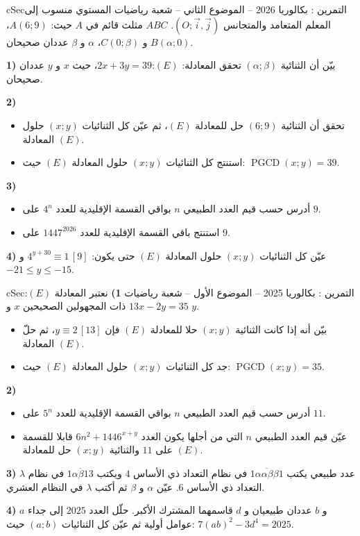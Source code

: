 \documentclass[12pt,a4paper]{article}
\newenvironment{BOX}[2]{\begin{otherlanguage}{english}\begin{arbox}{#1}{#2}}{\end{arbox}\end{otherlanguage}}
\newcounter{exo}
\newenvironment{tamrin}[1]{\stepcounter{exo}\begin{BOX}{cSec}{التمرين \theexo: #1}}{\end{BOX}}
\newcommand{\pgcd}{\operatorname{PGCD}}
\newenvironment{sq}{\begin{itemize}[leftmargin=2.4em,itemsep=3pt]}{\end{itemize}}
\newcommand{\qa}{\item[(أ)]}\newcommand{\qb}{\item[(ب)]}\newcommand{\qc}{\item[(جـ)]}\newcommand{\qd}{\item[(د)]}\newcommand{\qe}{\item[(هـ)]}
\begin{document}
\begin{tamrin}{بكالوريا 2026 -- الموضوع الثاني -- شعبة رياضيات}
المستوي منسوب إلى المعلم المتعامد والمتجانس $(O;\vec i,\vec j)$.
$ABC$ مثلث قائم في $A$ حيث: $A(6;9)$، $B(\alpha;0)$ و $C(0;\beta)$، $\alpha$ و $\beta$ عددان صحيحان.

\textbf{1)} بيّن أن الثنائية $(\alpha;\beta)$ تحقق المعادلة: $(E)$:\quad $2x+3y=39$، حيث $x$ و $y$ عددان صحيحان.

\textbf{2)}
\begin{sq}
\qa تحقق أن الثنائية $(6;9)$ حل للمعادلة $(E)$، ثم عيّن كل الثنائيات $(x;y)$ حلول المعادلة $(E)$.
\qb استنتج كل الثنائيات $(x;y)$ حلول المعادلة $(E)$ حيث: $\pgcd(x;y)=39$.
\end{sq}
\textbf{3)}
\begin{sq}
\qa أدرس حسب قيم العدد الطبيعي $n$ بواقي القسمة الإقليدية للعدد $4^n$ على $9$.
\qb استنتج باقي القسمة الإقليدية للعدد $1447^{2026}$ على $9$.
\end{sq}
\textbf{4)} عيّن كل الثنائيات $(x;y)$ حلول المعادلة $(E)$ حتى يكون: $4^{y+30}\equiv1\,[9]$ و $-21\le y\le -15$.
\end{tamrin}

\begin{tamrin}{بكالوريا 2025 -- الموضوع الأول -- شعبة رياضيات}
\textbf{1)} نعتبر المعادلة $(E)$:\quad $13x-2y=35$ ذات المجهولين الصحيحين $x$ و $y$.
\begin{sq}
\qa بيّن أنه إذا كانت الثنائية $(x;y)$ حلا للمعادلة $(E)$ فإن $y\equiv2\,[13]$، ثم حلّ المعادلة $(E)$.
\qb جد كل الثنائيات $(x;y)$ حلول المعادلة $(E)$ حيث: $\pgcd(x;y)=35$.
\end{sq}
\textbf{2)}
\begin{sq}
\qa أدرس حسب قيم العدد الطبيعي $n$ بواقي القسمة الإقليدية للعدد $5^n$ على $11$.
\qb عيّن قيم العدد الطبيعي $n$ التي من أجلها يكون العدد $6n^2+1446^{x+y}$ قابلا للقسمة على $11$ والثنائية $(x;y)$ حل للمعادلة $(E)$.
\end{sq}
\textbf{3)} $\lambda$ عدد طبيعي يكتب $\overline{1\alpha\alpha\beta\beta1}$ في نظام التعداد ذي الأساس $4$ ويكتب $\overline{1\alpha\beta13}$ في نظام التعداد ذي الأساس $6$.
عيّن $\alpha$ و $\beta$ ثم أكتب $\lambda$ في النظام العشري.

\textbf{4)} $a$ و $b$ عددان طبيعيان و $d$ قاسمهما المشترك الأكبر.
حلّل العدد $2025$ إلى جداء عوامل أولية ثم عيّن كل الثنائيات $(a;b)$ حيث: $7(ab)^2-3d^4=2025$.
\end{tamrin}
\end{document}

